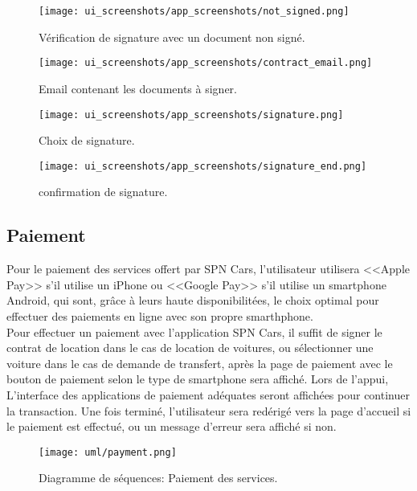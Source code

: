 \vspace{1cm}
\begin{multicols}{2}
    \begin{figure}[H]
        \centering
        \texttt{[image: ui\_screenshots/app\_screenshots/not\_signed.png]}
        \captionsetup{justification=centering}
        \caption{Vérification de signature avec un document non signé.}
        \label{fig:not_signed}
    \end{figure}
    \begin{figure}[H]
        \centering
        \texttt{[image: ui\_screenshots/app\_screenshots/contract\_email.png]}
        \captionsetup{justification=centering}
        \caption{Email contenant les documents à signer.}
        \label{fig:sign_documents}
    \end{figure}
\end{multicols}
\vspace{1cm}
\begin{multicols}{2}
    \begin{figure}[H]
        \centering
        \texttt{[image: ui\_screenshots/app\_screenshots/signature.png]}
        \captionsetup{justification=centering}
        \caption{Choix de signature.}
        \label{fig:signature_select}
    \end{figure}
    \begin{figure}[H]
        \centering
        \texttt{[image: ui\_screenshots/app\_screenshots/signature\_end.png]}
        \captionsetup{justification=centering}
        \caption{confirmation de signature.}
        \label{fig:confirm_sig}
    \end{figure}
\end{multicols}
\subsection{Paiement}
Pour le paiement des services offert par SPN Cars, l'utilisateur utilisera <<Apple Pay>> s'il utilise un iPhone ou <<Google Pay>> s'il utilise un smartphone Android, qui sont, grâce à leurs haute disponibilitées, le choix optimal pour effectuer des paiements en ligne avec son propre smarthphone.\\
Pour effectuer un paiement avec l'application SPN Cars, il suffit de signer le contrat de location dans le cas de location de voitures, ou sélectionner une voiture dans le cas de demande de transfert, après la page de paiement avec le bouton de paiement selon le type de smartphone sera affiché. Lors de l'appui, L'interface des applications de paiement adéquates seront affichées pour continuer la transaction. Une fois terminé, l'utilisateur sera redérigé vers la page d'accueil si le paiement est effectué, ou un message d'erreur sera affiché si non.
\vspace{1cm}
\begin{figure}[H]
    \centering
    \texttt{[image: uml/payment.png]}
    \captionsetup{justification=centering}
    \caption{Diagramme de séquences: Paiement des services.}
    \label{fig:seq_payment}
\end{figure}
